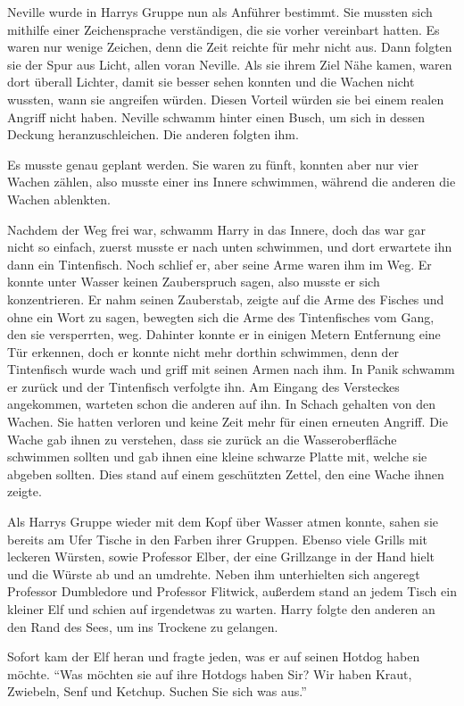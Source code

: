 Neville wurde in Harrys Gruppe nun als Anführer bestimmt. Sie mussten sich mithilfe einer Zeichensprache verständigen, die sie vorher vereinbart hatten. Es waren nur wenige Zeichen, denn die Zeit reichte für mehr nicht aus. Dann folgten sie der Spur aus Licht, allen voran Neville. Als sie ihrem Ziel Nähe kamen, waren dort überall Lichter, damit sie besser sehen konnten und die Wachen nicht wussten, wann sie angreifen würden. Diesen Vorteil würden sie bei einem realen Angriff nicht haben. Neville schwamm hinter einen Busch, um sich in dessen Deckung heranzuschleichen. Die anderen folgten ihm.

Es musste genau geplant werden. Sie waren zu fünft, konnten aber nur vier Wachen zählen, also musste einer ins Innere schwimmen, während die anderen die Wachen ablenkten.

Nachdem der Weg frei war, schwamm Harry in das Innere, doch das war gar nicht so einfach, zuerst musste er nach unten schwimmen, und dort erwartete ihn dann ein Tintenfisch. Noch schlief er, aber seine Arme waren ihm im Weg. Er konnte unter Wasser keinen Zauberspruch sagen, also musste er sich konzentrieren. Er nahm seinen Zauberstab, zeigte auf die Arme des Fisches und ohne ein Wort zu sagen, bewegten sich die Arme des Tintenfisches vom Gang, den sie versperrten, weg. Dahinter konnte er in einigen Metern Entfernung eine Tür erkennen, doch er konnte nicht mehr dorthin schwimmen, denn der Tintenfisch wurde wach und griff mit seinen Armen nach ihm. In Panik schwamm er zurück und der Tintenfisch verfolgte ihn. Am Eingang des Versteckes angekommen, warteten schon die anderen auf ihn. In Schach gehalten von den Wachen. Sie hatten verloren und keine Zeit mehr für einen erneuten Angriff. Die Wache gab ihnen zu verstehen, dass sie zurück an die Wasseroberfläche schwimmen sollten und gab ihnen eine kleine schwarze Platte mit, welche sie abgeben sollten. Dies stand auf einem geschützten Zettel, den eine Wache ihnen zeigte.

Als Harrys Gruppe wieder mit dem Kopf über Wasser atmen konnte, sahen sie bereits am Ufer Tische in den Farben ihrer Gruppen. Ebenso viele Grills mit leckeren Würsten, sowie Professor Elber, der eine Grillzange in der Hand hielt und die Würste ab und an umdrehte. Neben ihm unterhielten sich angeregt Professor Dumbledore und Professor Flitwick, außerdem stand an jedem Tisch ein kleiner Elf und schien auf irgendetwas zu warten. Harry folgte den anderen an den Rand des Sees, um ins Trockene zu gelangen.

Sofort kam der Elf heran und fragte jeden, was er auf seinen Hotdog haben möchte. \enquote{Was möchten sie auf ihre Hotdogs haben Sir? Wir haben Kraut, Zwiebeln, Senf und Ketchup. Suchen Sie sich was aus.}

